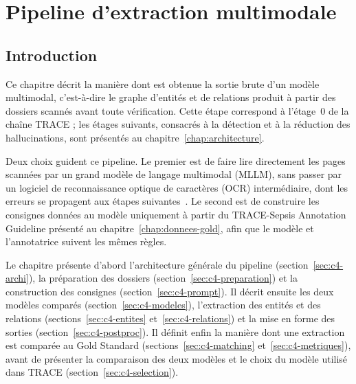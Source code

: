 
\chapter{Pipeline d'extraction multimodale}
\label{chap:extraction}

\section{Introduction}\label{sec:c4-intro}

Ce chapitre décrit la manière dont est obtenue la sortie brute d'un modèle multimodal, c'est-à-dire le graphe d'entités et de relations produit à partir des dossiers scannés avant toute vérification. Cette étape correspond à l'étage~0 de la chaîne TRACE ; les étages suivants, consacrés à la détection et à la réduction des hallucinations, sont présentés au chapitre~\ref{chap:architecture}.

Deux choix guident ce pipeline. Le premier est de faire lire directement les pages scannées par un grand modèle de langage multimodal (MLLM), sans passer par un logiciel de reconnaissance optique de caractères (OCR) intermédiaire, dont les erreurs se propagent aux étapes suivantes~\cite{zhang2025ocrhindersrag}. Le second est de construire les consignes données au modèle uniquement à partir du TRACE-Sepsis Annotation Guideline présenté au chapitre~\ref{chap:donnees-gold}, afin que le modèle et l'annotatrice suivent les mêmes règles.

Le chapitre présente d'abord l'architecture générale du pipeline (section~\ref{sec:c4-archi}), la préparation des dossiers (section~\ref{sec:c4-preparation}) et la construction des consignes (section~\ref{sec:c4-prompt}). Il décrit ensuite les deux modèles comparés (section~\ref{sec:c4-modeles}), l'extraction des entités et des relations (sections~\ref{sec:c4-entites} et~\ref{sec:c4-relations}) et la mise en forme des sorties (section~\ref{sec:c4-postproc}). Il définit enfin la manière dont une extraction est comparée au Gold Standard (sections~\ref{sec:c4-matching} et~\ref{sec:c4-metriques}), avant de présenter la comparaison des deux modèles et le choix du modèle utilisé dans TRACE (section~\ref{sec:c4-selection}).


